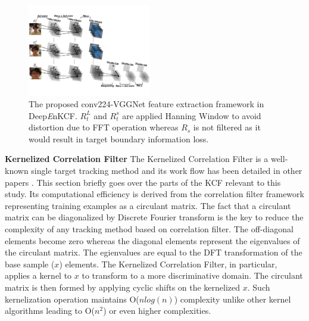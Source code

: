 \documentclass[10pt,twocolumn,letterpaper]{article}
\begin{document}
\begin{figure}[!h]
\centering
\includegraphics[width=0.48\textwidth]{./figures/Filters_Details_CNN.pdf}
\caption{The proposed conv224-VGGNet feature extraction framework in Deep{\it E}nKCF. $R_{t}^{L}$ and $R_{t}^{s}$ are applied Hanning Window
to avoid distortion due to FFT operation whereas $R_{s}$ is not filtered as it would result in target boundary information loss.}
\label{fig:Filters_CNN}
\end{figure}

\textbf{Kernelized Correlation Filter} The Kernelized Correlation
Filter is a well-known single target tracking method and its work
flow has been detailed in other papers
\cite{henriques2012exploiting,henriques2015high}. This section briefly
goes over the parts of the KCF relevant to this study. Its
computational efficiency is derived from the correlation filter
framework representing training examples as a circulant matrix. The
fact that a circulant matrix can be diagonalized by Discrete Fourier
transform is the key to reduce the complexity of any tracking method
based on correlation filter. The off-diagonal elements become zero
whereas the diagonal elements represent the eigenvalues of the
circulant matrix. The egienvalues are equal to the DFT transformation
of the base sample ($x$) elements. The Kernelized Correlation Filter,
in particular, applies a kernel to $x$ to transform to a more
discriminative domain. The circulant matrix is then formed by applying
cyclic shifts on the kernelized $x$. Such kernelization operation
maintains O($nlog(n)$) complexity unlike other kernel algorithms
leading to O($n^{2}$) or even higher complexities.
\end{document}
